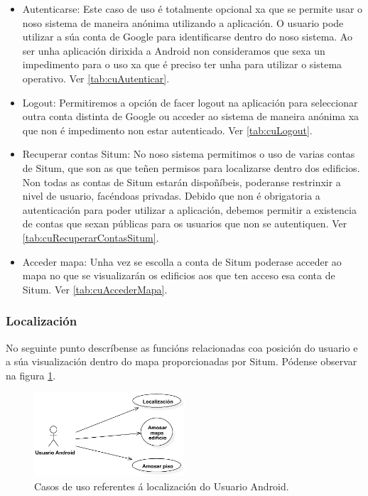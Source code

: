 \begin{itemize}
	\item Autenticarse: Este caso de uso é totalmente opcional xa que se permite usar o noso sistema de maneira anónima utilizando a aplicación. O usuario pode utilizar a súa conta de Google para identificarse dentro do noso sistema. Ao ser unha aplicación dirixida a Android non consideramos que sexa un impedimento para o uso xa que é preciso ter unha para utilizar o sistema operativo. Ver \ref{tab:cuAutenticar}.
	\item Logout: Permitiremos a opción de facer logout na aplicación para seleccionar outra conta distinta de Google ou acceder ao sistema de maneira anónima xa que non é impedimento non estar autenticado. Ver \ref{tab:cuLogout}.
	\item Recuperar contas Situm: No noso sistema permitimos o uso de varias contas de Situm, que son as que teñen permisos para localizarse dentro dos edificios. Non todas as contas de Situm estarán dispoñíbeis, poderanse restrinxir a nivel de usuario, facéndoas privadas. Debido que non é obrigatoria a autenticación para poder utilizar a aplicación, debemos permitir a existencia de contas que sexan públicas para os usuarios que non se autentiquen. Ver \ref{tab:cuRecuperarContasSitum}.
	\item Acceder mapa: Unha vez se escolla a conta de Situm poderase acceder ao mapa no que se visualizarán os edificios aos que ten acceso esa conta de Situm. Ver \ref{tab:cuAccederMapa}.
\end{itemize}

\subsubsection{Localización}
No seguinte punto descríbense as funcións relacionadas coa posición do usuario e a súa visualización dentro do mapa proporcionadas por Situm. Pódense observar na figura \ref{fig:cuUsuarioAndroidPrincipalLocalizacion}.

\begin{figure}[tbh]
	\begin{center}
		\includegraphics[width=0.5\textwidth]{figures/CasosUso/UsuarioAndroidLocalizacion}
		\caption{Casos de uso referentes á localización do Usuario Android.}
		\label{fig:cuUsuarioAndroidPrincipalLocalizacion}
	\end{center}
\end{figure}

